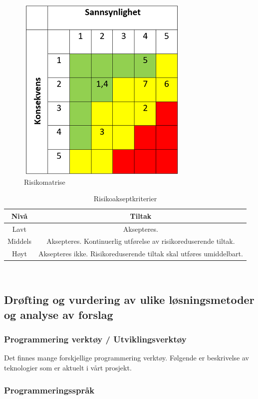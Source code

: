\begin{figure}[h]
\centering
\includegraphics{images/risikomatrise2.png}
\caption{Risikomatrise}
\label{figur1}
\end{figure}
 

\begin{table}[h]
\centering
\begin{tabular}{|c|c|} 
\hline
Nivå & Tiltak\\
\hline\hline
Lavt & Aksepteres. \\
\hline
Middels & Aksepteres. Kontinuerlig utførelse av risikoreduserende tiltak.  \\
\hline
Høyt & Aksepteres ikke. Risikoreduserende tiltak skal utføres umiddelbart.\\
\hline 
\end{tabular}
\caption{Risikoakseptkriterier}
\label{table5}
\end{table} 

\
\newpage
\subsection{Drøfting og vurdering av ulike løsningsmetoder og analyse av forslag}

\subsubsection{Programmering verktøy / Utviklingsverktøy}
Det finnes mange forskjellige programmering verktøy. Følgende er beskrivelse av teknologier som er aktuelt i vårt prosjekt.

\subsubsection*{Programmeringsspråk}

